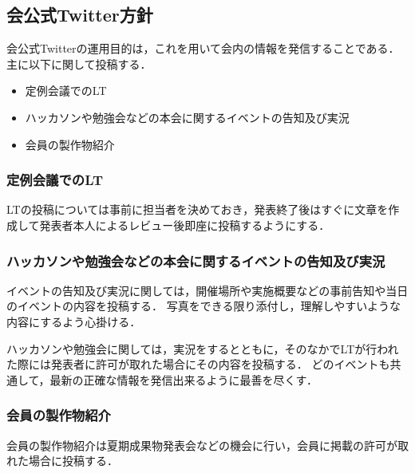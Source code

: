 \subsection*{会公式Twitter方針}


会公式Twitterの運用目的は，これを用いて会内の情報を発信することである．
主に以下に関して投稿する．

\begin{itemize}
\item 定例会議でのLT
\item ハッカソンや勉強会などの本会に関するイベントの告知及び実況
\item 会員の製作物紹介
\end{itemize}

\subsubsection*{定例会議でのLT}
LTの投稿については事前に担当者を決めておき，発表終了後はすぐに文章を作成して発表者本人によるレビュー後即座に投稿するようにする．

\subsubsection*{ハッカソンや勉強会などの本会に関するイベントの告知及び実況}
イベントの告知及び実況に関しては，開催場所や実施概要などの事前告知や当日のイベントの内容を投稿する．
写真をできる限り添付し，理解しやすいような内容にするよう心掛ける．

ハッカソンや勉強会に関しては，実況をするとともに，そのなかでLTが行われた際には発表者に許可が取れた場合にその内容を投稿する．
どのイベントも共通して，最新の正確な情報を発信出来るように最善を尽くす．

\subsubsection*{会員の製作物紹介}
会員の製作物紹介は夏期成果物発表会などの機会に行い，会員に掲載の許可が取れた場合に投稿する．
